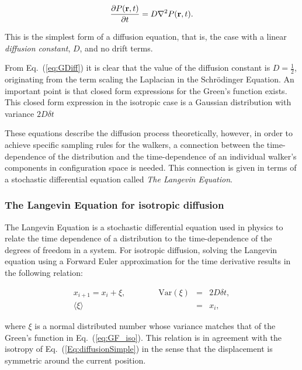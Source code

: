 \begin{equation}
 \label{Eq:diffusionSimple}
 \frac{\partial P(\mathbf{r}, t)}{\partial t} = D\nabla^2 P(\mathbf{r}, t) .
\end{equation}

This is the simplest form of a diffusion equation, that is, the case with a linear \textit{diffusion constant}, $D$, and no drift terms. 

From Eq.~(\ref{eq:GDiff}) it is clear that the value of the diffusion constant is $D=\frac{1}{2}$, originating from the term scaling the Laplacian in the Schrödinger Equation. An important point is that closed form expressions for the Green's function exists. This closed form expression in the isotropic case is a Gaussian distribution with variance $2D\delta t$ \cite{abInitioMC}


These equations describe the diffusion process theoretically, however, in order to achieve specific sampling rules for the walkers, a connection between the time-dependence of the distribution and the time-dependence of an individual walker's components in configuration space is needed. This connection is given in terms of a stochastic differential equation called \textit{The Langevin Equation}.

\subsubsection{The Langevin Equation for isotropic diffusion}

The Langevin Equation is a stochastic differential equation used in physics to relate the time dependence of a distribution to the time-dependence of the degrees of freedom in a system. For isotropic diffusion, solving the Langevin equation using a Forward Euler approximation for the time derivative results in the following relation:

\begin{eqnarray}
\label{eq:langevinSolSimple}
 x_{i+1} = x_i + \xi, \qquad\qquad \mathrm{Var}(\xi) &=& 2D\delta t, \\
			     \langle\xi\rangle &=& x_i, \nonumber 
\end{eqnarray}

where $\xi$ is a normal distributed number whose variance matches that of the Green's function in Eq.~(\ref{eq:GF_iso}). This relation is in agreement with the isotropy of Eq.~(\ref{Eq:diffusionSimple}) in the sense that the displacement is symmetric around the current position.


